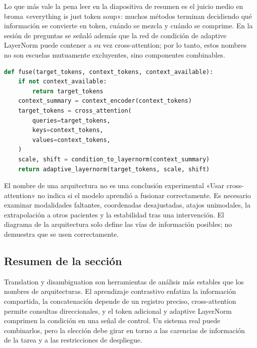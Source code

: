 Lo que más vale la pena leer en la diapositiva de resumen es el juicio medio en broma «everything is just token soup»: muchos métodos terminan decidiendo qué información se convierte en token, cuándo se mezcla y cuándo se comprime. En la sesión de preguntas se señaló además que la red de condición de adaptive LayerNorm puede contener a su vez cross-attention; por lo tanto, estos nombres no son escuelas mutuamente excluyentes, sino componentes combinables.

\begin{lstlisting}[language=Python,caption={Pseudocódigo unificado de un fusionador multimodal: conserva explícitamente la modalidad faltante y la dirección}]
def fuse(target_tokens, context_tokens, context_available):
    if not context_available:
        return target_tokens
    context_summary = context_encoder(context_tokens)
    target_tokens = cross_attention(
        queries=target_tokens,
        keys=context_tokens,
        values=context_tokens,
    )
    scale, shift = condition_to_layernorm(context_summary)
    return adaptive_layernorm(target_tokens, scale, shift)
\end{lstlisting}


\begin{warningbox}{El nombre de una arquitectura no es una conclusión experimental}
«Usar cross-attention» no indica si el modelo aprendió a fusionar correctamente. Es necesario examinar modalidades faltantes, coordenadas desajustadas, atajos unimodales, la extrapolación a otros pacientes y la estabilidad tras una intervención. El diagrama de la arquitectura solo define las vías de información posibles; no demuestra que se usen correctamente.
\end{warningbox}

\subsection{Resumen de la sección}

Translation y disambiguation son herramientas de análisis más estables que los nombres de arquitecturas. El aprendizaje contrastivo enfatiza la información compartida, la concatenación depende de un registro preciso, cross-attention permite consultas direccionales, y el token adicional y adaptive LayerNorm comprimen la condición en una señal de control. Un sistema real puede combinarlos, pero la elección debe girar en torno a las carencias de información de la tarea y a las restricciones de despliegue.
